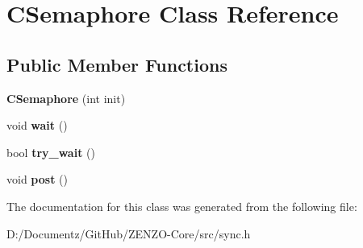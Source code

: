 \hypertarget{class_c_semaphore}{}\section{C\+Semaphore Class Reference}
\label{class_c_semaphore}
\subsection*{Public Member Functions}
\begin{DoxyCompactItemize}
\item 
\mbox{\label{class_c_semaphore_ac9cc749c7424852d7fb4378811d0dae1}} 
{\bfseries C\+Semaphore} (int init)
\item 
\mbox{\label{class_c_semaphore_a1c108bd981fe68527ec8ef5e7b0d116c}} 
void {\bfseries wait} ()
\item 
\mbox{\label{class_c_semaphore_abb8a07e6cac29dc72f044cd536a9f9e5}} 
bool {\bfseries try\+\_\+wait} ()
\item 
\mbox{\label{class_c_semaphore_af6a956f6c191e824485fd3af6db39318}} 
void {\bfseries post} ()
\end{DoxyCompactItemize}


The documentation for this class was generated from the following file\+:\begin{DoxyCompactItemize}
\item 
D\+:/\+Documentz/\+Git\+Hub/\+Z\+E\+N\+Z\+O-\/\+Core/src/sync.\+h\end{DoxyCompactItemize}
